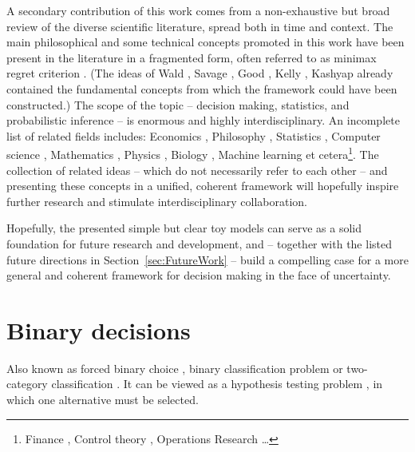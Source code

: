 \documentclass{article}
\theoremstyle{definition}
\begin{document}
A secondary contribution of this work
comes from a non-exhaustive but broad review of the diverse scientific literature, spread both in time and context.
The main philosophical and some technical concepts promoted in this work have been present in the literature in a fragmented form, often referred to as minimax regret criterion \cite{paper:Milnor,book:LuceRaiffa}. (The ideas of Wald \cite{book:Wald}, Savage \cite{book:Savage}, Good \cite{paper:GoodWeather}, Kelly \cite{Kelly}, Kashyap \cite{Kashyap1974,Kashyap1971} already contained the fundamental concepts from which the framework could have been constructed.)
The scope of the topic -- decision making, statistics, and probabilistic inference -- is enormous and highly interdisciplinary.
An incomplete list of related fields includes: Economics \cite{book:JuliaUncertainty}, Philosophy \cite{sep:InterpretationOfProbability,book:ScientificExplanationBraithwaite}, Statistics \cite{book:CoxStatistics}, Computer science \cite{book:InformationTheory,Kelly}, Mathematics \cite{book:Klenke}, Physics \cite{book:PathriaStatisticalMechanics,book:ErrorAnalysis}, Biology \cite{book:EvolutionCognition}, Machine learning \cite{book:ProbabilisticMachineLearning,book:Bishop,book:RL, book:NorvigRussell} et cetera\footnote{Finance \cite{book:ValueAtRisk,book:FinancialRiskManagerHandbook}, Control theory \cite{book:Control}, Operations Research \cite{book:OperationsResearch,book:IntroductionOperationsResearch}\dots}.
The collection of related ideas -- which do not necessarily refer to each other -- and presenting these concepts in a unified, coherent framework will hopefully inspire further research and stimulate interdisciplinary collaboration.

Hopefully, the presented simple but clear toy models can serve as a solid foundation for future research and development, and -- together with the listed future directions in Section~\ref{sec:FutureWork} -- build a compelling case for a more general and coherent framework for decision making in the face of uncertainty.

\newpage

\tableofcontents

\newpage

\section{Binary decisions}

Also known as forced binary choice \cite{book:StatisticalInference}, binary classification problem \cite{book:DecisionTheory} or two-category classification \cite{book:PatternClassification}. It can be viewed as a hypothesis testing problem \cite{book:StatisticalInference,book:CoxStatistics}, in which one alternative must be selected.
\end{document}
